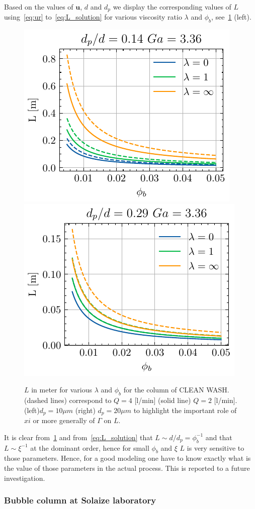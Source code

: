Based on the values of $\textbf{u}$, $d$ and $d_p$ we display the corresponding values of $L$ using~\ref{eq:ur} to~\ref{eq:L_solution} for various viscosity ratio $\lambda$ and $\phi_b$, see~\ref{fig:height} (left). 
\begin{figure}[h!]
    \centering
    \includegraphics[height=0.40\textwidth]{image/flotation/examples/case_one.pdf}
    \includegraphics[height=0.40\textwidth]{image/flotation/examples/case_one_xi2.pdf}
    \caption{
    $L$ in meter for various $\lambda$ and $\phi_b$ for the column of CLEAN WASH. 
    (dashed lines) correspond to $Q=4$ [l/min] (solid line) $Q = 2$ [l/min].
    (left)$d_p = 10\mu m$
    (right) $d_p = 20\mu m$ to highlight the important role of $xi$ or more generally of $\Gamma$ on $L$. }
    \label{fig:height}
\end{figure}
It is clear from~\ref{fig:height} and from~\ref{eq:L_solution} that $L \sim d/d_p = \phi_b^{-1}$ and that $L \sim  \xi^{-1}$ at the dominant order, hence for small $\phi_b$ and $\xi$ $L$ is very sensitive to those parameters.
Hence, for a good modeling one have to know exactly what is the value of those parameters in the actual process.  
This is reported to a future investigation. 


\subsubsection*{Bubble column at Solaize laboratory}

